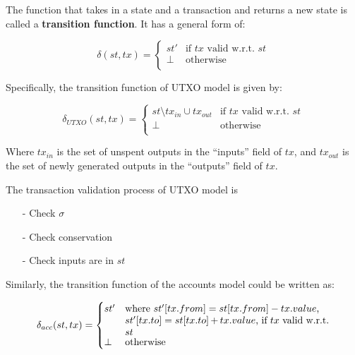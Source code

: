 The function that takes in a state and a transaction and returns a new state is called a \textbf{transition function}. It has a general form of:

\begin{equation}
    \delta (st,tx) =
        \begin{cases}
        st' & \text{if $tx$ valid w.r.t. $st$} \\
        \perp & \text{otherwise} \\
        \end{cases}
\end{equation}

Specifically, the transition function of UTXO model is given by:

\begin{equation}
    \delta_{UTXO} (st,tx) =
        \begin{cases}
        st \setminus tx_{in} \cup tx_{out}  & \text{if $tx$ valid w.r.t. $st$} \\
        \perp & \text{otherwise} \\
        \end{cases}
\end{equation}

Where $tx_{in}$ is the set of unspent outputs in the ``inputs'' field of $tx$, and $tx_{out}$ is the set of newly generated outputs in the ``outputs'' field of $tx$.

The transaction validation process of UTXO model is
\begin{itemize}
    \item[-] Check $\sigma$
    \item[-] Check conservation
    \item[-] Check inputs are in $st$
\end{itemize}

Similarly, the transition function of the accounts model could be written as:

\begin{equation}
    \delta_{acc} (st,tx) =
        \begin{cases}
        st' & \parbox[t]{.6\textwidth}{where $st' [tx.from] = st [tx.from] - tx.value$, \\
        $st' [tx.to] = st [tx.to] + tx.value$, if $tx$ valid w.r.t. $st$} \\
        \perp & \text{otherwise} \\
        \end{cases}
\end{equation}


